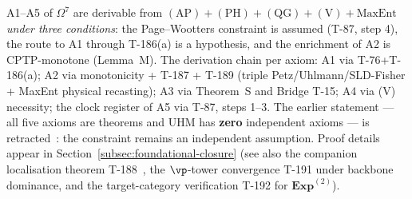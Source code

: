 \begin{theorembox}
\label{thm:t190-axiomatic-closure}
A1--A5 of $\Omega^7$ are derivable from
$(\text{AP})+(\text{PH})+(\text{QG})+(\text{V})+\text{MaxEnt}$ \emph{under three conditions}:
the Page--Wootters constraint is assumed (T-87, step 4), the route to A1 through
T-186(a) is a hypothesis, and the enrichment of A2 is CPTP-monotone (Lemma~M). The
derivation chain per axiom:
A1 via T-76+T-186(a); A2 via monotonicity + T-187 + T-189 (triple Petz/Uhlmann/SLD-Fisher + MaxEnt
physical recasting); A3 via Theorem~S and Bridge T-15; A4 via (V) necessity;
the clock register of A5 via T-87, steps 1--3. The earlier statement --- all five axioms
are theorems and UHM has \textbf{zero} independent axioms --- is
retracted~\status{$\times$}: the constraint remains an independent assumption. Proof details
appear in Section~\ref{subsec:foundational-closure} (see also the companion localisation
theorem T-188~, the $\vp$-tower convergence T-191 under backbone dominance, and the
target-category verification T-192 for $\mathbf{Exp}^{(2)}$).
\end{theorembox}
